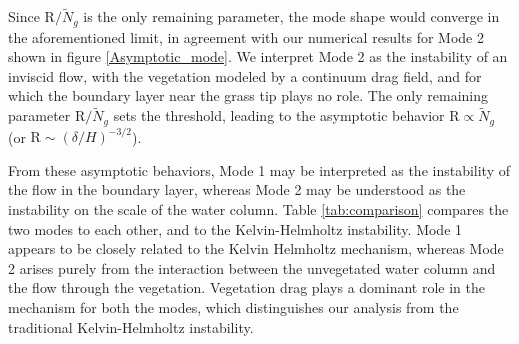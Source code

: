 \documentclass[aps,prl,twocolumn,superscriptaddress,10pt]{revtex4-1}  %
\newcommand{\hg}{h_g}
\newcommand{\Rey}{\text{R}}
\newcommand{\Ndg}{\tilde{N}_g}
\begin{document}
Since $\Rey/\Ndg$ is the only remaining parameter, the mode shape would converge in the aforementioned limit, in agreement with our numerical results for Mode 2 shown in figure \ref{Asymptotic_mode}. 
We interpret Mode 2 as the instability of an inviscid flow, with the vegetation modeled by a continuum drag field, and for which the boundary layer near the grass tip plays no role. The only remaining parameter $\Rey/\Ndg$ 
sets the threshold, leading to the asymptotic behavior $\Rey \propto \Ndg$ (or $\Rey \sim ({\delta}/{H})^{-3/2}$).

From these asymptotic behaviors, Mode 1 may be interpreted as the instability of the flow in the boundary layer, whereas Mode 2 may be understood as the instability on the scale of the water column. 
Table \ref{tab:comparison} compares the two modes to each other, and to the Kelvin-Helmholtz instability. 
Mode 1 appears to be closely related to the Kelvin Helmholtz mechanism, whereas Mode 2 arises purely from the interaction between the unvegetated water column and the flow through the vegetation. 
Vegetation drag plays a dominant role in the mechanism for both the modes, which distinguishes our analysis from the traditional Kelvin-Helmholtz instability. 
\end{document}
